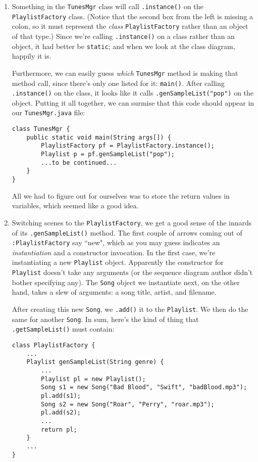 \begin{enumerate}
\itemsep.1em

\item Something in the \texttt{TunesMgr} class will call \texttt{.instance()}
on the \texttt{PlaylistFactory} class. (Notice that the second box from the
left is missing a colon, so it must represent the \textit{class}
\texttt{PlaylistFactory} rather than an object of that type.) Since we're
calling \texttt{.instance()} on a class rather than an object, it had better
be \texttt{static}; and when we look at the class diagram, happily it is.

Furthermore, we can easily guess \textit{which} \texttt{TunesMgr} method is
making that method call, since there's only one listed for it:
\texttt{main()}. After calling \texttt{.instance()} on the class, it looks
like it calls \texttt{.genSampleList("pop")} on the object. Putting it all
together, we can surmise that this code should appear in our
\texttt{TunesMgr.java} file:

\begin{Verbatim}[fontsize=\footnotesize,samepage=true,frame=single]
class TunesMgr {
    public static void main(String args[]) {
        PlaylistFactory pf = PlaylistFactory.instance();
        Playlist p = pf.genSampleList("pop");
        ...to be continued...
    }
}
\end{Verbatim}

All we had to figure out for ourselves was to store the return values in
variables, which seemed like a good idea.

\item Switching scenes to the \texttt{PlaylistFactory}, we get a good sense of
the innards of its \texttt{.genSampleList()} method. The first couple of
arrows coming out of \texttt{:PlaylistFactory} say ``new", which as you may
guess indicates an \textit{instantiation} and a constructor invocation. In
the first case, we're instantiating a new \texttt{Playlist} object. Apparently
the constructor for \texttt{Playlist} doesn't take any arguments (or the
sequence diagram author didn't bother specifying any). The \texttt{Song}
object we instantiate next, on the other hand, takes a slew of arguments: a
song title, artist, and filename.

After creating this new \texttt{Song}, we \texttt{.add()} it to the
\texttt{Playlist}. We then do the same for another \texttt{Song}. In sum,
here's the kind of thing that \texttt{.getSampleList()} must contain:

\begin{Verbatim}[fontsize=\footnotesize,samepage=true,frame=single]
class PlaylistFactory {
    ...
    Playlist genSampleList(String genre) {
        ...
        Playlist pl = new Playlist();
        Song s1 = new Song("Bad Blood", "Swift", "badBlood.mp3");
        pl.add(s1);
        Song s2 = new Song("Roar", "Perry", "roar.mp3");
        pl.add(s2);
		...
        return pl;
    }
    ...
}
\end{Verbatim}


\end{enumerate}
